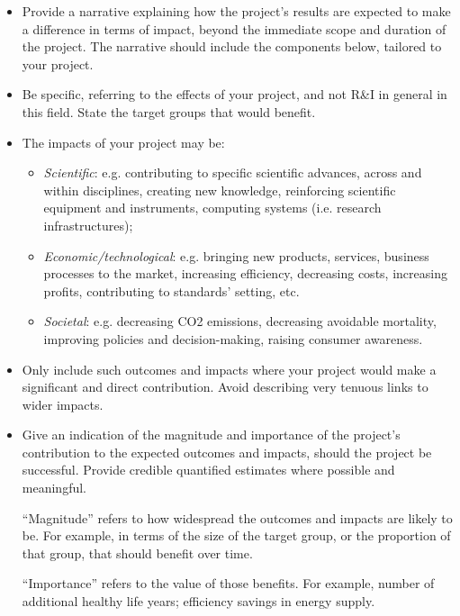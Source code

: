 \documentclass[12pt,draftproposal]{msca-pf}
\begin{document}
\begin{itemize}
    \item Provide a narrative explaining how the project’s results are expected
    to make a difference in terms of impact, beyond the immediate scope and
    duration of the project. The narrative should include the components below,
    tailored to your project.

    \item Be specific, referring to the effects of your project, and not R\&I
    in general in this field. State the target groups that would benefit.

    \item The impacts of your project may be:

    \begin{itemize}
        \item \emph{Scientific}: e.g. contributing to specific scientific advances,
        across and within disciplines, creating new knowledge, reinforcing
        scientific equipment and instruments, computing systems (i.e. research
        infrastructures);

        \item \emph{Economic/technological}: e.g. bringing new
        products, services, business processes to the market, increasing efficiency,
        decreasing costs, increasing profits, contributing to standards’ setting,
        etc.

        \item \emph{Societal}: e.g. decreasing CO2 emissions,
        decreasing avoidable mortality, improving policies and decision-making,
        raising consumer awareness.
    \end{itemize}

    \item Only include such outcomes and impacts where your project would make
    a significant and direct contribution. Avoid describing very tenuous links
    to wider impacts.

    \item Give an indication of the magnitude and importance of the project's
    contribution to the expected outcomes and impacts, should the project be
    successful. Provide credible quantified estimates where possible and meaningful.

    ``Magnitude'' refers to how widespread the outcomes and impacts are likely
    to be. For example, in terms of the size of the target group, or the
    proportion of that group, that should benefit over time.

    ``Importance'' refers to the value of those benefits. For example, number of
    additional healthy life years; efficiency savings in energy supply.
\end{itemize}
\end{document}
